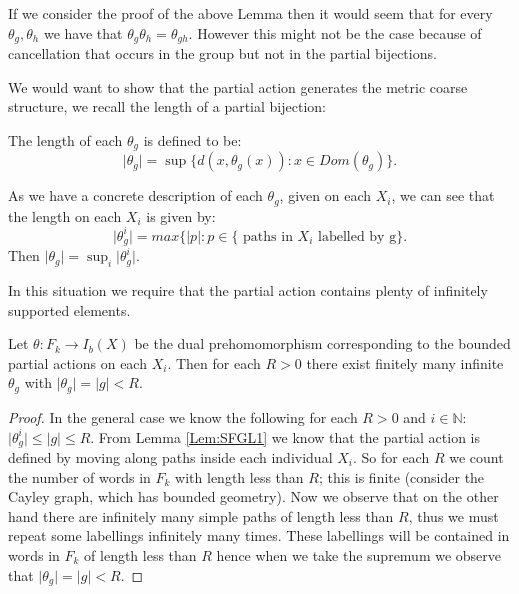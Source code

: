 \begin{remark}
If we consider the proof of the above Lemma then it would seem that for every $\theta_{g},\theta_{h}$ we have that $\theta_{g}\theta_{h} = \theta_{gh}$. However this might not be the case because of cancellation that occurs in the group but not in the partial bijections. 
\end{remark}

We would want to show that the partial action generates the metric coarse structure, we recall the length of a partial bijection:

\begin{definition}
The length of each $\theta_{g}$ is defined to be:
\begin{equation*}
\vert \theta_{g} \vert = \sup \lbrace d(x,\theta_{g}(x)) : x \in Dom(\theta_{g})\rbrace.
\end{equation*} 
\end{definition}

\begin{remark}
As we have a concrete description of each $\theta_{g}$, given on each $X_{i}$, we can see that the length on each $X_{i}$ is given by:
\begin{equation*}
\vert \theta_{g}^{i} \vert = max\lbrace \vert p \vert: p \in \lbrace \mbox{ paths in }X_{i}\mbox{ labelled by g}\rbrace.
\end{equation*} Then $\vert \theta_{g} \vert = \sup_{i} \vert \theta_{g}^{i} \vert$.
\end{remark}

In this situation we require that the partial action contains plenty of infinitely supported elements. 

\begin{proposition}\label{Prop:Inf}
Let $\theta: F_{k} \rightarrow I_{b}(X)$ be the dual prehomomorphism corresponding to the bounded partial actions on each $X_{i}$. Then for each $R>0$ there exist finitely many infinite $\theta_{g}$ with $\vert \theta_{g} \vert = \vert g \vert < R$. 
\end{proposition}
\begin{proof}

In the general case we know the following for each $R>0$ and $i \in \mathbb{N}$: $\vert \theta_{g}^{i} \vert \leq \vert g \vert \leq R$. From Lemma \ref{Lem:SFGL1} we know 
that the partial action is defined by moving along paths inside each individual $X_{i}$. So for each $R$ we count the number of words in $F_{k}$ with length less than $R$; this is finite (consider the Cayley graph, which has bounded geometry). Now we observe that on the other hand there are infinitely many simple paths of length less than $R$, thus we must repeat some labellings infinitely many times. These labellings will be contained in words in $F_{k}$ of length less than $R$ hence when we take the supremum we observe that $\vert \theta_{g} \vert = \vert g \vert < R$. \end{proof}

